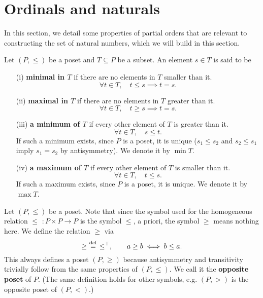 \section{Ordinals and naturals} \label{ordinals-and-naturals}

In this section, we detail some properties of partial orders that are relevant to constructing the set of natural numbers, which we will build in this section.
\\

\begin{definition} \label{min-max-defs}
    Let $(P,\le)$ be a poset and $T \subseteq P$ be a subset. An element $s \in T$ is said to be
    \\

    \begin{itemize}
        \item[(i)] \textbf{minimal in $T$} if there are no elements in $T$ smaller than it.
        \[
            \forall t \in T, \quad t \le s \implies t = s.
        \]

        \item[(ii)] \textbf{maximal in $T$} if there are no elements in $T$ greater than it.
        \[
            \forall t \in T, \quad t \ge s \implies t = s.    
        \]

        \item[(iii)] \textbf{a minimum of $T$} if every other element of $T$ is greater than it. 
        \[
            \forall t \in T, \quad s \le t.
        \]
        If such a minimum exists, since $P$ is a poset, it is unique ($s_1 \le s_2$ and $s_2 \le s_1$ imply $s_1 = s_2$ by antisymmetry). We denote it by $\min T$. 
        \\

        \item[(iv)] \textbf{a maximum of $T$} if every other element of $T$ is smaller than it. 
        \[
            \forall t \in T, \quad t \le s.    
        \]
        If such a maximum exists, since $P$ is a poset, it is unique. We denote it by $\max T$.
        \\

    \end{itemize}
\end{definition}

\begin{example} \label{opposite-poset}
    Let $(P,\le)$ be a poset. Note that since the symbol used for the homogeneous relation $\le \,\, : P \times P \to P$ is the symbol $\le$, a priori, the symbol $\ge$ means nothing here. We define the relation $\ge$ via
    \[
        \ge \,\, \overset{\mathrm{def}}{=} \,\, \le^{\top}, \qquad a \ge b \iff b \le a.     
    \]
    This always defines a poset $(P, \ge)$ because antisymmetry and transitivity trivially follow from the same properties of $(P,\le)$. We call it the \textbf{opposite poset} of $P$. (The same definition holds for other symbols, e.g. $(P,>)$ is the opposite poset of $(P, <)$.)
\end{example}

